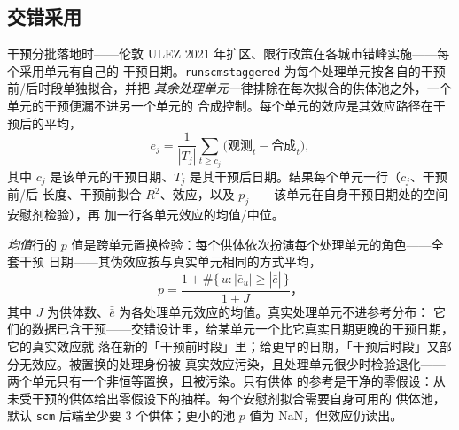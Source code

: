 \documentclass[11pt]{ctexrep}
\newcommand{\codeunderscore}{\textunderscore\allowbreak}
\newcommand{\code}[1]{\texttt{\let\_\codeunderscore #1}}
\begin{document}
\subsection{交错采用}\label{sec:scmstaggered}
干预分批落地时——伦敦 ULEZ 2021 年扩区、限行政策在各城市错峰实施——每个采用单元有自己的
干预日期。\code{run\_scm\_staggered} 为每个处理单元按各自的干预前/后时段单独拟合，并把
\emph{其余处理单元}一律排除在每次拟合的供体池之外，一个单元的干预便漏不进另一个单元的
合成控制。每个单元的效应是其效应路径在干预后的平均，
\begin{equation}
  \bar{e}_j = \frac{1}{|T_j|} \sum_{t \ge c_j} \bigl(\text{观测}_t - \text{合成}_t\bigr),
\end{equation}
其中 $c_j$ 是该单元的干预日期、$T_j$ 是其干预后日期。结果每个单元一行（$c_j$、干预前/后
长度、干预前拟合 $R^2$、效应，以及 $p_j$——该单元在自身干预日期处的空间安慰剂检验），再
加一行各单元效应的均值/中位。

\emph{均值}行的 $p$ 值是跨单元置换检验：每个供体依次扮演每个处理单元的角色——全套干预
日期——其伪效应按与真实单元相同的方式平均，
\begin{equation}
  p = \frac{1 + \#\{\,u : |\bar{e}_u| \ge |\bar{\bar{e}}|\,\}}{1 + J}，
\end{equation}
其中 $J$ 为供体数、$\bar{\bar{e}}$ 为各处理单元效应的均值。真实处理单元不进参考分布：
它们的数据已含干预——交错设计里，给某单元一个比它真实日期更晚的干预日期，它的真实效应就
落在新的「干预前时段」里；给更早的日期，「干预后时段」又部分无效应。被置换的处理身份被
真实效应污染，且处理单元很少时检验退化——两个单元只有一个非恒等置换，且被污染。只有供体
的参考是干净的零假设：从未受干预的供体给出零假设下的抽样。每个安慰剂拟合需要自身可用的
供体池，默认 \code{scm} 后端至少要 3 个供体；更小的池 $p$ 值为 NaN，但效应仍读出。
\end{document}
